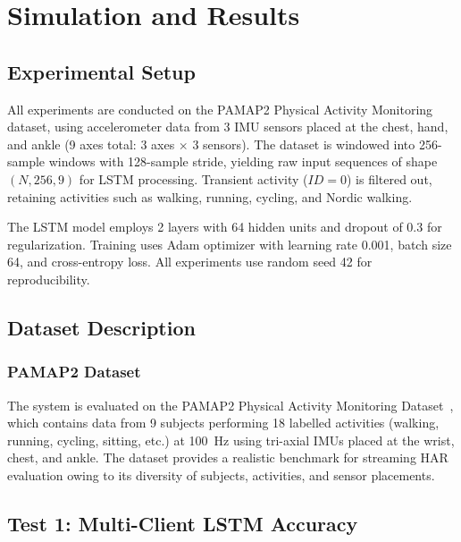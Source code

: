 \chapter{Simulation and Results}
\label{chap:results}

\section{Experimental Setup}

All experiments are conducted on the PAMAP2 Physical Activity Monitoring dataset, using accelerometer data from 3 IMU sensors placed at the chest, hand, and ankle (9 axes total: 3 axes $\times$ 3 sensors). The dataset is windowed into 256-sample windows with 128-sample stride, yielding raw input sequences of shape $(N, 256, 9)$ for LSTM processing. Transient activity ($ID=0$) is filtered out, retaining activities such as walking, running, cycling, and Nordic walking.

The LSTM model employs 2 layers with 64 hidden units and dropout of 0.3 for regularization. Training uses Adam optimizer with learning rate 0.001, batch size 64, and cross-entropy loss. All experiments use random seed 42 for reproducibility.

\section{Dataset Description}
\label{sec:dataset}

\subsection{PAMAP2 Dataset}

The system is evaluated on the PAMAP2 Physical Activity Monitoring Dataset~\cite{reiss2012introducing}, which contains data from 9 subjects performing 18 labelled activities (walking, running, cycling, sitting, etc.) at 100~Hz using tri-axial IMUs placed at the wrist, chest, and ankle. The dataset provides a realistic benchmark for streaming HAR evaluation owing to its diversity of subjects, activities, and sensor placements.

\section{Test 1: Multi-Client LSTM Accuracy}


